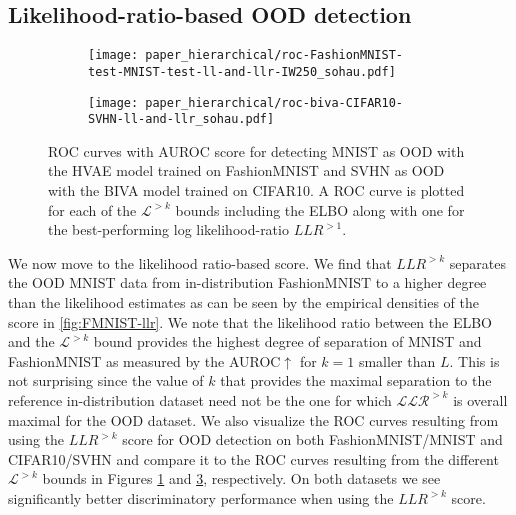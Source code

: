 \subsection{Likelihood-ratio-based OOD detection}
\begin{figure}
    \centering
    \begin{subfigure}[l]{0.495\columnwidth}
        \texttt{[image: paper\_hierarchical/roc-FashionMNIST-test-MNIST-test-ll-and-llr-IW250\_sohau.pdf]}
        \caption{}
        \label{fig:FMNIST-roc-llr}
    \end{subfigure}
    \hfill
    \begin{subfigure}[r]{0.495\columnwidth}
        \texttt{[image: paper\_hierarchical/roc-biva-CIFAR10-SVHN-ll-and-llr\_sohau.pdf]}
        \caption{}
        \label{fig:CIFAR10-roc-llr}
    \end{subfigure}
    \caption[ROC curves for out of distribution detection (MNIST/FashionMNIST and SVHN/CIFAR10)]{%
        ROC curves with AUROC score for detecting  MNIST as OOD with the HVAE model trained on FashionMNIST and  SVHN as OOD with the BIVA model trained on CIFAR10. 
        A ROC curve is plotted for each of the $\mathcal{L}^{>k}$ bounds including the ELBO along with one for the best-performing log likelihood-ratio $LLR^{>1}$.
    }
\end{figure}
We now move to the likelihood ratio-based score.
We find that $LLR^{>k}$ separates the OOD MNIST data from in-distribution FashionMNIST to a higher degree than the likelihood estimates as can be seen by the empirical densities of the score in \cref{fig:FMNIST-llr}.
We note that the likelihood ratio between the ELBO and the $\mathcal{L}^{>k}$ bound provides the highest degree of separation of MNIST and FashionMNIST as measured by the AUROC$\uparrow$ for $k=1$ smaller than $L$.
This is not surprising since the value of $k$ that provides the maximal separation to the reference in-distribution dataset need not be the one for which $\mathcal{LLR}^{>k}$ is overall maximal for the OOD dataset.
We also visualize the ROC curves resulting from using the $LLR^{>k}$ score for OOD detection on both FashionMNIST/MNIST and CIFAR10/SVHN and compare it to the ROC curves resulting from the different $\mathcal{L}^{>k}$ bounds in Figures \ref{fig:FMNIST-roc-llr} and \ref{fig:CIFAR10-roc-llr}, respectively.
On both datasets we see significantly better discriminatory performance when using the $LLR^{>k}$ score.

